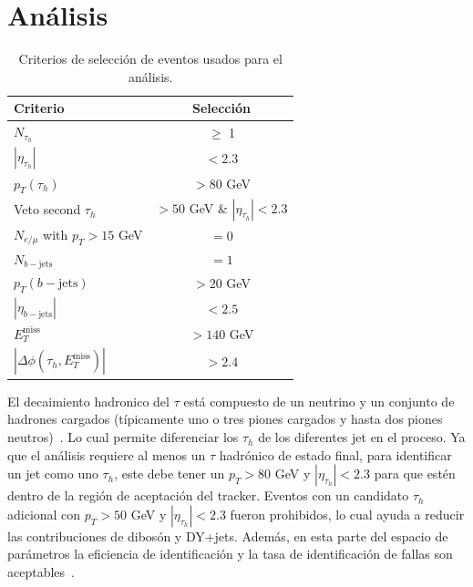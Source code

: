 \section{Análisis}\label{sec:Analysis}
%
\vspace{10 pt}
\begin{table}
\begin{center}
\begin{tabular}{ l  c}\hline\hline
Criterio & Selección\\
 \hline
    $N_{\tau_{h}}$       & $\ge$ 1 \\
    $|\eta_{\tau_{h}}|$ & $< 2.3$ \\
    $p_{T} (\tau_{h})$ & $> 80$ GeV \\
    Veto second $\tau_{h}$ &  $> 50$ GeV \& $|\eta_{\tau_{h}}| < 2.3$ \\
    $N_{e/\mu}$ with $p_{T} > 15$ GeV & $= 0$ \\
    $N_{b-\text{jets}}$ & $= 1$\\
    $p_{T} (b-\text{jets})$ & $> 20$ GeV \\
    $|\eta_{b-\text{jets}}|$ & $< 2.5$ \\
    $ E^{\text{miss}}_{T}$ & $> 140$ GeV \\
     $|\Delta \phi (\tau_{h}, E^{\text{miss}}_{T})|$ & $ > 2.4$ \\
   \hline\hline
 \end{tabular}
 \caption {Criterios de selección de eventos usados para el análisis.}
 \label{tab:selections}
\end{center}
\end{table}
%

El decaimiento hadronico del $\tau$ está compuesto de un neutrino y un conjunto de hadrones cargados (típicamente uno o tres piones cargados y hasta dos piones neutros)~\cite{Aad:2014rga}. Lo cual permite diferenciar los $\tau_h$ de los diferentes jet en el proceso. Ya que el análisis requiere al menos un $\tau$ hadrónico de estado final, para identificar un jet como uno $\tau_h$, este debe tener un $p_T > 80$ GeV y $|\eta_{\tau_h}| < 2.3$ para que estén dentro de la región de aceptación del tracker. Eventos con un candidato $\tau_h$ adicional con $p_T > 50$ GeV y $|\eta_{\tau_h}| < 2.3$ fueron prohibidos, lo cual ayuda a reducir las contribuciones de dibosón y DY+jets. Además, en esta parte del espacio de parámetros la eficiencia de identificación y la tasa de identificación de fallas son aceptables~\cite{Padeken:2265826}. 

